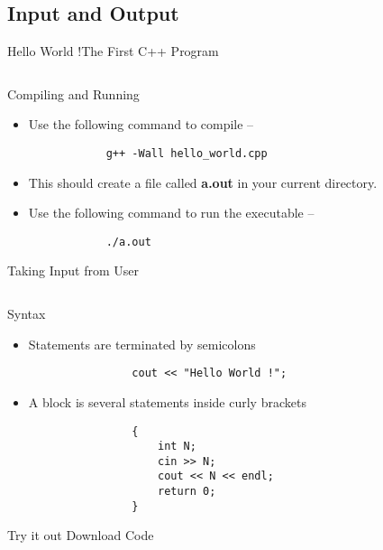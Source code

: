 \subsection{Input and Output}

\begin{frame}{Hello World !}{The First C++ Program}
  \inputminted{c++}{../code/hello_world/hello_world.cpp}
\end{frame}

\begin{frame}[fragile]{Compiling and Running}
  \begin{itemize}
      \item Use the following command to compile --
        \begin{verbatim}
            g++ -Wall hello_world.cpp
        \end{verbatim}
      \item This should create a file called \textbf{a.out} in your current directory.
      \item Use the following command to run the executable --
        \begin{verbatim}
            ./a.out
        \end{verbatim}
  \end{itemize}
\end{frame}

\begin{frame}{Taking Input from User}{}
  \inputminted{c++}{../code/input/input.cpp}
\end{frame}

\begin{frame}[fragile]{Syntax}%
    \begin{itemize}
        \item Statements are terminated by semicolons
            \begin{verbatim}
                cout << "Hello World !";
            \end{verbatim}
        \item A block is several statements inside curly brackets
            \begin{verbatim}
                {
                    int N;
                    cin >> N;
                    cout << N << endl;
                    return 0;
                }
            \end{verbatim}
    \end{itemize}
\end{frame}

\begin{frame}{Try it out}{}
    Download Code
\end{frame}
